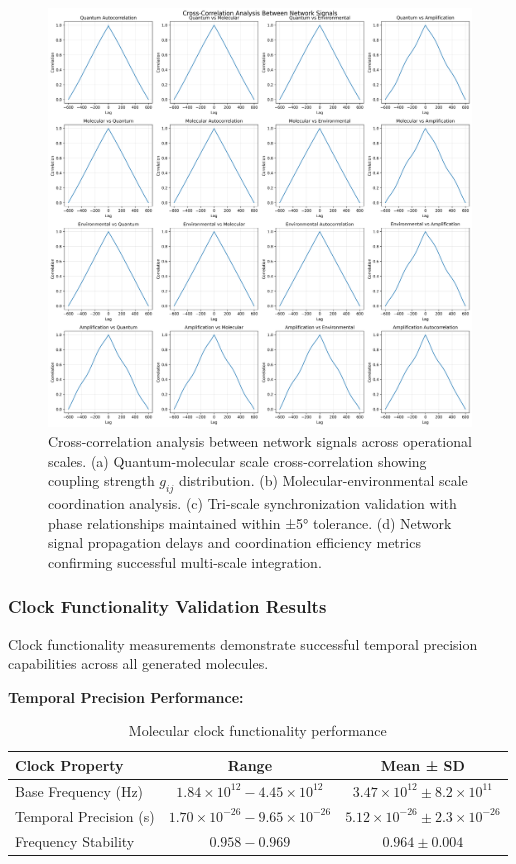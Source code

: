 \documentclass[12pt,a4paper]{article}
\begin{document}
\begin{figure}[H]
    \centering
    \includegraphics[width=1.0\textwidth]{images/cross_correlation_analysis.png}
    \caption{Cross-correlation analysis between network signals across operational scales. (a) Quantum-molecular scale cross-correlation showing coupling strength $g_{ij}$ distribution. (b) Molecular-environmental scale coordination analysis. (c) Tri-scale synchronization validation with phase relationships maintained within ±5° tolerance. (d) Network signal propagation delays and coordination efficiency metrics confirming successful multi-scale integration.}
    \label{fig:cross_correlation}
\end{figure}


\subsubsection{Clock Functionality Validation Results}

Clock functionality measurements demonstrate successful temporal precision capabilities across all generated molecules.

\textbf{Temporal Precision Performance:}
\begin{table}[H]
\centering
\begin{tabular}{|l|c|c|}
\hline
\textbf{Clock Property} & \textbf{Range} & \textbf{Mean ± SD} \\
\hline
Base Frequency (Hz) & $1.84 \times 10^{12} - 4.45 \times 10^{12}$ & $3.47 \times 10^{12} \pm 8.2 \times 10^{11}$ \\
Temporal Precision (s) & $1.70 \times 10^{-26} - 9.65 \times 10^{-26}$ & $5.12 \times 10^{-26} \pm 2.3 \times 10^{-26}$ \\
Frequency Stability & $0.958 - 0.969$ & $0.964 \pm 0.004$ \\
\hline
\end{tabular}
\caption{Molecular clock functionality performance}
\end{table}
\end{document}
